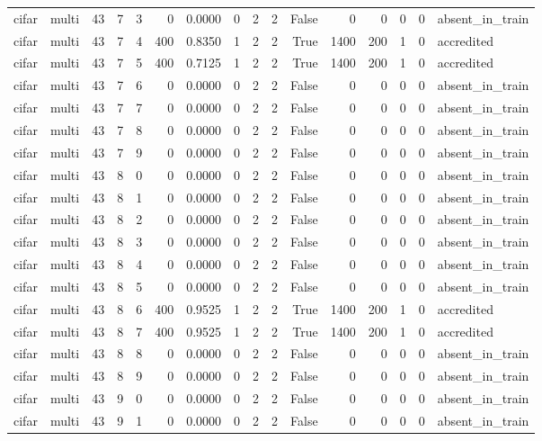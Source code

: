 \begin{tabular}{llrrrrrrrrrrrrrl}
cifar & multi & 43 & 7 & 3 & 0 & 0.0000 & 0 & 2 & 2 & False & 0 & 0 & 0 & 0 & absent\_in\_train \\
cifar & multi & 43 & 7 & 4 & 400 & 0.8350 & 1 & 2 & 2 & True & 1400 & 200 & 1 & 0 & accredited \\
cifar & multi & 43 & 7 & 5 & 400 & 0.7125 & 1 & 2 & 2 & True & 1400 & 200 & 1 & 0 & accredited \\
cifar & multi & 43 & 7 & 6 & 0 & 0.0000 & 0 & 2 & 2 & False & 0 & 0 & 0 & 0 & absent\_in\_train \\
cifar & multi & 43 & 7 & 7 & 0 & 0.0000 & 0 & 2 & 2 & False & 0 & 0 & 0 & 0 & absent\_in\_train \\
cifar & multi & 43 & 7 & 8 & 0 & 0.0000 & 0 & 2 & 2 & False & 0 & 0 & 0 & 0 & absent\_in\_train \\
cifar & multi & 43 & 7 & 9 & 0 & 0.0000 & 0 & 2 & 2 & False & 0 & 0 & 0 & 0 & absent\_in\_train \\
cifar & multi & 43 & 8 & 0 & 0 & 0.0000 & 0 & 2 & 2 & False & 0 & 0 & 0 & 0 & absent\_in\_train \\
cifar & multi & 43 & 8 & 1 & 0 & 0.0000 & 0 & 2 & 2 & False & 0 & 0 & 0 & 0 & absent\_in\_train \\
cifar & multi & 43 & 8 & 2 & 0 & 0.0000 & 0 & 2 & 2 & False & 0 & 0 & 0 & 0 & absent\_in\_train \\
cifar & multi & 43 & 8 & 3 & 0 & 0.0000 & 0 & 2 & 2 & False & 0 & 0 & 0 & 0 & absent\_in\_train \\
cifar & multi & 43 & 8 & 4 & 0 & 0.0000 & 0 & 2 & 2 & False & 0 & 0 & 0 & 0 & absent\_in\_train \\
cifar & multi & 43 & 8 & 5 & 0 & 0.0000 & 0 & 2 & 2 & False & 0 & 0 & 0 & 0 & absent\_in\_train \\
cifar & multi & 43 & 8 & 6 & 400 & 0.9525 & 1 & 2 & 2 & True & 1400 & 200 & 1 & 0 & accredited \\
cifar & multi & 43 & 8 & 7 & 400 & 0.9525 & 1 & 2 & 2 & True & 1400 & 200 & 1 & 0 & accredited \\
cifar & multi & 43 & 8 & 8 & 0 & 0.0000 & 0 & 2 & 2 & False & 0 & 0 & 0 & 0 & absent\_in\_train \\
cifar & multi & 43 & 8 & 9 & 0 & 0.0000 & 0 & 2 & 2 & False & 0 & 0 & 0 & 0 & absent\_in\_train \\
cifar & multi & 43 & 9 & 0 & 0 & 0.0000 & 0 & 2 & 2 & False & 0 & 0 & 0 & 0 & absent\_in\_train \\
cifar & multi & 43 & 9 & 1 & 0 & 0.0000 & 0 & 2 & 2 & False & 0 & 0 & 0 & 0 & absent\_in\_train \\

\end{tabular}
